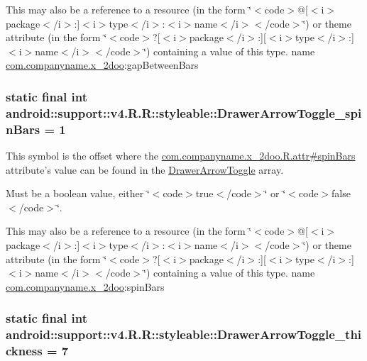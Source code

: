 This may also be a reference to a resource (in the form \char`\"{}$<$code$>$@\mbox{[}$<$i$>$package$<$/i$>$:\mbox{]}$<$i$>$type$<$/i$>$:$<$i$>$name$<$/i$>$$<$/code$>$\char`\"{}) or theme attribute (in the form \char`\"{}$<$code$>$?\mbox{[}$<$i$>$package$<$/i$>$:\mbox{]}\mbox{[}$<$i$>$type$<$/i$>$:\mbox{]}$<$i$>$name$<$/i$>$$<$/code$>$\char`\"{}) containing a value of this type.  name \hyperlink{namespacecom_1_1companyname_1_1x__2doo}{com.companyname.x\_\-2doo}:gapBetweenBars \hypertarget{classandroid_1_1support_1_1v4_1_1_r_1_1styleable_eddc59e474629cd8f55d74fd27cb0b1f}{
\subsubsection[{DrawerArrowToggle\_\-spinBars}]{\setlength{\rightskip}{0pt plus 5cm}static final int android::support::v4.R.R::styleable::DrawerArrowToggle\_\-spinBars = 1}}
\label{classandroid_1_1support_1_1v4_1_1_r_1_1styleable_eddc59e474629cd8f55d74fd27cb0b1f}


This symbol is the offset where the \hyperlink{classcom_1_1companyname_1_1x__2doo_1_1_r_1_1attr_20ca8839c7cbe451e133f9ae5200d5e0}{com.companyname.x\_\-2doo.R.attr\#spinBars} attribute's value can be found in the \hyperlink{classandroid_1_1support_1_1v4_1_1_r_1_1styleable_df2952a999161d3c408fb6267800afe6}{DrawerArrowToggle} array.

Must be a boolean value, either \char`\"{}$<$code$>$true$<$/code$>$\char`\"{} or \char`\"{}$<$code$>$false$<$/code$>$\char`\"{}. 

This may also be a reference to a resource (in the form \char`\"{}$<$code$>$@\mbox{[}$<$i$>$package$<$/i$>$:\mbox{]}$<$i$>$type$<$/i$>$:$<$i$>$name$<$/i$>$$<$/code$>$\char`\"{}) or theme attribute (in the form \char`\"{}$<$code$>$?\mbox{[}$<$i$>$package$<$/i$>$:\mbox{]}\mbox{[}$<$i$>$type$<$/i$>$:\mbox{]}$<$i$>$name$<$/i$>$$<$/code$>$\char`\"{}) containing a value of this type.  name \hyperlink{namespacecom_1_1companyname_1_1x__2doo}{com.companyname.x\_\-2doo}:spinBars \hypertarget{classandroid_1_1support_1_1v4_1_1_r_1_1styleable_fb89c8d4e0500b91043fa694395850ec}{
\subsubsection[{DrawerArrowToggle\_\-thickness}]{\setlength{\rightskip}{0pt plus 5cm}static final int android::support::v4.R.R::styleable::DrawerArrowToggle\_\-thickness = 7}}
\label{classandroid_1_1support_1_1v4_1_1_r_1_1styleable_fb89c8d4e0500b91043fa694395850ec}


